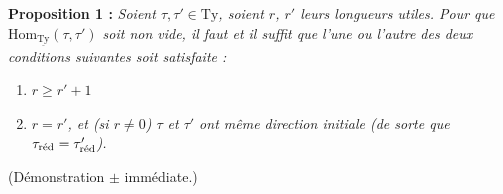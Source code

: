\documentclass[11pt]{article}
\newcommand{\printedpage}[1]{\marginpar{\footnotesize p.~#1}}
\newcommand{\uTy}{\underline{\mathrm{Ty}}}
\newcommand{\red}{\text{\upshape réd}}
\begin{document}
\textbf{Proposition 1 :} \textit{Soient $\tau,\tau'\in\mathrm{Ty}$, soient $r$, $r'$ leurs longueurs utiles. Pour que $\mathrm{Hom}_{\uTy}(\tau,\tau')$ soit non vide, il faut et il suffit que l'une ou l'autre des deux conditions suivantes soit satisfaite :}

\begin{enumerate}[label={}, leftmargin=*]
\item[\textit{a)}] $r\geq r'+1$

\printedpage{55}

\item[\textit{b)}] \textit{$r=r'$, et (si $r\neq0$) $\tau$ et $\tau'$ ont même direction initiale (de sorte que $\tau_{\red}=\tau'_{\red}$).}
\end{enumerate}

(Démonstration $\pm$ immédiate.)
\end{document}
